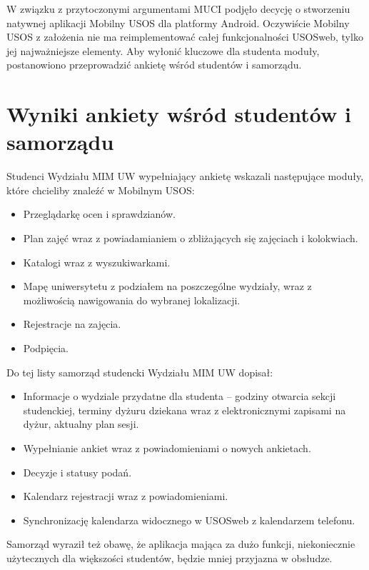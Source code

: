 \documentclass{pracamgr}
\begin{document}
W związku z przytoczonymi argumentami MUCI podjęło decycję o stworzeniu natywnej
aplikacji Mobilny USOS dla platformy Android. Oczywiście Mobilny USOS z założenia
nie ma reimplementować całej funkcjonalności USOSweb, tylko jej najważniejsze
elementy. Aby wyłonić kluczowe dla studenta moduły, postanowiono przeprowadzić
ankietę wśród studentów i samorządu.


\section{Wyniki ankiety wśród studentów i samorządu}

Studenci Wydziału MIM UW wypełniający ankietę wskazali następujące moduły, które
chcieliby znaleźć w Mobilnym USOS:

\begin{itemize}
	\item Przeglądarkę ocen i sprawdzianów.
	\item Plan zajęć wraz z powiadamianiem o zbliżających się zajęciach
	      i kolokwiach.
	\item Katalogi wraz z wyszukiwarkami.
	\item Mapę uniwersytetu z podziałem na poszczególne wydziały, wraz z
	      możliwością nawigowania do wybranej lokalizacji.
	\item Rejestracje na zajęcia.
	\item Podpięcia.
\end{itemize}

Do tej listy samorząd studencki Wydziału MIM UW dopisał:

\begin{itemize}
	\item Informacje o wydziale przydatne dla studenta -- godziny otwarcia sekcji
	      studenckiej, terminy dyżuru dziekana wraz z elektronicznymi zapisami na
	      dyżur, aktualny plan sesji.
	\item Wypełnianie ankiet wraz z powiadomieniami o nowych ankietach.
	\item Decyzje i statusy podań.
	\item Kalendarz rejestracji wraz z powiadomieniami.
	\item Synchronizację kalendarza widocznego w USOSweb z kalendarzem telefonu.
\end{itemize}
Samorząd wyraził też obawę, że aplikacja mająca za dużo funkcji, niekoniecznie
użytecznych dla większości studentów, będzie mniej przyjazna w obsłudze.
\end{document}

